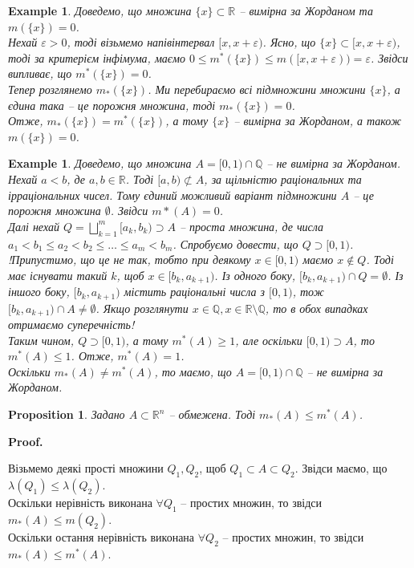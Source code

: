\documentclass[a4paper, 10pt]{article}
\makeatletter
\def\huge{\displaystyle}
\def\qed{$\blacksquare$}
\theoremstyle{theoremdd}
\theoremstyle{theoremdd}
\theoremstyle{theoremdd}
\theoremstyle{theoremdd}
\theoremstyle{theoremdd}
\newtheorem{example}[theorem]{Example}
\theoremstyle{theoremdd}
\theoremstyle{theoremdd}
\theoremstyle{theoremdd}
\theoremstyle{theoremdd}
\newtheorem{proposition}[theorem]{Proposition}
\theoremstyle{theoremdd}
\theoremstyle{theoremdd}
\theoremstyle{theoremdd}
\theoremstyle{theoremdd}
\theoremstyle{theoremdd}
\theoremstyle{theoremdd}
\renewenvironment{proof}[1][Proof.\\]{\par
\pushQED{\hfill \qed}%
\normalfont \topsep6\p@\@plus6\p@\relax
\trivlist
\item\relax
{\bfseries
#1\@addpunct{.}}\hspace\labelsep\ignorespaces
}{%
\popQED\endtrivlist\@endpefalse
}
\makeatother
\begin{document}
\begin{example}
Доведемо, що множина $\{x\} \subset \mathbb{R}$ -- вимірна за Жорданом та $m(\{x\}) = 0$.\\
Нехай $\varepsilon > 0$, тоді візьмемо напівінтервал $[x,x+\varepsilon)$. Ясно, що $\{x\} \subset [x,x+\varepsilon)$, тоді за критерієм інфімума, маємо $0 \leq m^*(\{x\}) \leq m([x,x+\varepsilon)) = \varepsilon$. Звідси випливає, що $m^*(\{x\}) = 0$.\\
Тепер розглянемо $m_*(\{x\})$. Ми перебираємо всі підмножини множини $\{x\}$, а єдина така -- це порожня множина, тоді $m_*(\{x\}) = 0$.\\
Отже, $m_*(\{x\}) = m^*(\{x\})$, а тому $\{x\}$ -- вимірна за Жорданом, а також $m(\{x\}) = 0$.
\end{example}

\begin{example}
Доведемо, що множина $A =[0,1) \cap \mathbb{Q}$ -- не вимірна за Жорданом.\\
Нехай $a<b$, де $a,b \in \mathbb{R}$. Тоді $[a,b) \not\subset A$, за щільністю раціональних та ірраціональних чисел. Тому єдиний можливий варіант підмножини $A$ -- це порожня множина $\emptyset$. Звідси $m*(A) = 0$.\\
Далі нехай $Q = \huge\bigsqcup_{k=1}^m [a_k,b_k) \supset A$ -- проста множина, де числа $a_1 < b_1 \leq a_2 < b_2 \leq \dots \leq a_m < b_m$. Спробуємо довести, що $Q \supset [0,1)$.\\
!Припустимо, що це не так, тобто при деякому $x \in [0,1)$ маємо $x \not \in Q$. Тоді має існувати такий $k$, щоб $x \in [b_k,a_{k+1})$. Із одного боку, $[b_k,a_{k+1}) \cap Q = \emptyset$. Із іншого боку, $[b_k,a_{k+1})$ містить раціональні числа з $[0,1)$, тож $[b_k,a_{k+1}) \cap A \neq \emptyset$. Якщо розглянути $x \in \mathbb{Q}, x \in \mathbb{R} \setminus \mathbb{Q}$, то в обох випадках отримаємо суперечність!\\
Таким чином, $Q \supset [0,1)$, а тому $m^*(A) \geq 1$, але оскільки $[0,1) \supset A$, то $m^*(A) \leq 1$. Отже, $m^*(A) = 1$.\\
Оскільки $m_*(A) \neq m^*(A)$, то маємо, що $A = [0,1) \cap \mathbb{Q}$ -- не вимірна за Жорданом.
\end{example}

\begin{proposition}
Задано $A \subset \mathbb{R}^n$ -- обмежена. Тоді $m_*(A) \leq m^*(A)$.
\end{proposition}

\begin{proof}
Візьмемо деякі прості множини $Q_1,Q_2$, щоб $Q_1 \subset A \subset Q_2$. Звідси маємо, що $\lambda(Q_1) \leq \lambda(Q_2)$.\\
Оскільки нерівність виконана $\forall Q_1$ -- простих множин, то звідси $m_*(A) \leq m(Q_2)$.\\
Оскільки остання нерівність виконана $\forall Q_2$ -- простих множин, то звідси $m_*(A) \leq m^*(A)$.
\end{proof}
\end{document}
